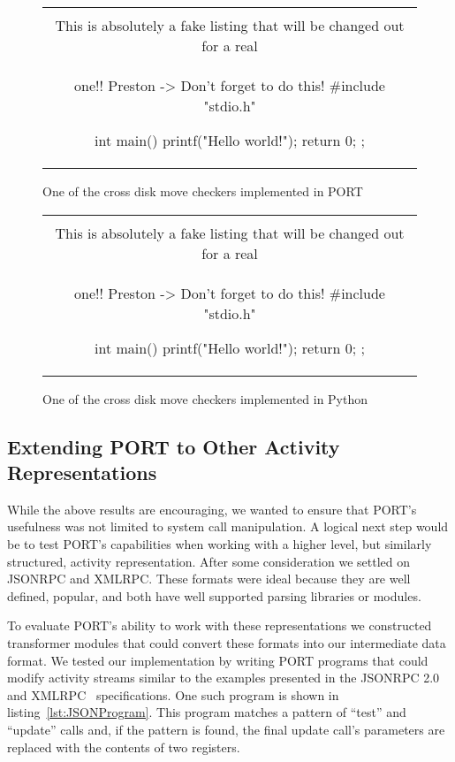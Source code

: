\begin{figure}[H]
\centering
\begin{tabular}{c}
\begin{lstlisting}
\\ This is absolutely a fake listing that will be changed out for a real
\\ one!!  Preston -> Don't forget to do this!
#include "stdio.h"

int main() {
    printf("Hello world!\n");
    return 0;
};
\end{lstlisting}
\end{tabular}
\caption{One of the cross disk move checkers implemented in PORT}
\label{lst:Cross-DiskMovePORT}
\end{figure}


\begin{figure}[H]
\centering
\begin{tabular}{c}
\begin{lstlisting}
\\ This is absolutely a fake listing that will be changed out for a real
\\ one!!  Preston -> Don't forget to do this!
#include "stdio.h"

int main() {
    printf("Hello world!\n");
    return 0;
};
\end{lstlisting}
\end{tabular}
\caption{One of the cross disk move checkers implemented in Python}
\label{lst:Cross-DiskMovePython}
\end{figure}

\subsection{Extending PORT to Other Activity Representations}

While the above results are encouraging, we wanted to ensure that PORT's
usefulness was not limited to system call manipulation.
A logical next step would be to test PORT's capabilities when working
with a higher level, but similarly structured, activity representation.
After some consideration we settled on JSONRPC and XMLRPC.  These formats
were ideal because they are well defined, popular, and both have well
supported parsing libraries or modules.

To evaluate PORT's ability to work with these representations we
constructed transformer modules that could convert these formats into our
intermediate data format.
We tested our implementation by writing PORT programs that could modify
activity streams similar to the examples presented in the JSONRPC
2.0~\cite{jsonspec} and XMLRPC~\cite{xmlspec}
specifications.  One such program is shown in
listing~\ref{lst:JSONProgram}.  This program matches a pattern of ``test''
and ``update'' calls and, if the pattern is found, the final update call's
parameters are replaced with the contents of two registers.

